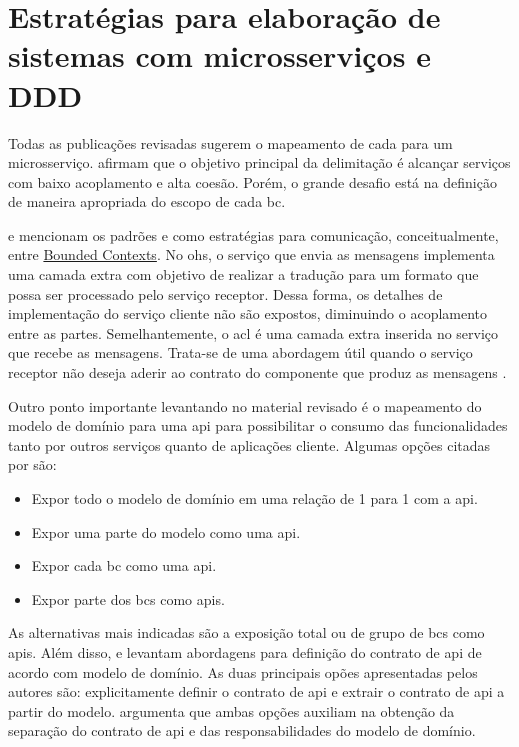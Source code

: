 \section{Estratégias para elaboração de sistemas com microsserviços e DDD}
Todas as publicações revisadas sugerem o mapeamento de cada  para um microsserviço.  afirmam que o objetivo principal da delimitação é alcançar serviços com baixo acoplamento e alta coesão. Porém, o grande desafio está na definição de maneira apropriada do escopo de cada \acrshort{bc}.

 e  mencionam os padrões  e  como estratégias para comunicação, conceitualmente, entre \hyperref[section:bounded_context]{Bounded Contexts}. No \acrshort{ohs}, o serviço que envia as mensagens implementa uma camada extra com objetivo de realizar a tradução para um formato que possa ser processado pelo serviço receptor. Dessa forma, os detalhes de implementação do serviço cliente não são expostos, diminuindo o acoplamento entre as partes. Semelhantemente, o \acrshort{acl} é uma camada extra inserida no serviço que recebe as mensagens. Trata-se de uma abordagem útil quando o serviço receptor não deseja aderir ao contrato do componente que produz as mensagens \cite{evans2004ddd}.

Outro ponto importante levantando no material revisado é o mapeamento do modelo de domínio para uma \acrfull{api} para possibilitar o consumo das funcionalidades tanto por outros serviços quanto de aplicações cliente. Algumas opções citadas por  são:
\begin{itemize}
    \item Expor todo o modelo de domínio em uma relação de 1 para 1 com a \acrshort{api}.
    \item Expor uma parte do modelo como uma \acrshort{api}.
    \item Expor cada \acrshort{bc} como uma \acrshort{api}.
    \item Expor parte dos \acrshort{bc}s como \acrshort{api}s.
\end{itemize}

As alternativas mais indicadas são a exposição total ou de grupo de \acrshort{bc}s como \acrshort{api}s. Além disso,  e  levantam abordagens para definição do contrato de \acrshort{api} de acordo com modelo de domínio. As duas principais opões apresentadas pelos autores são: explicitamente definir o contrato de \acrshort{api} e extrair o contrato de \acrshort{api} a partir do modelo.  argumenta que ambas opções auxiliam na obtenção da separação do contrato de \acrshort{api} e das responsabilidades do modelo de domínio.

